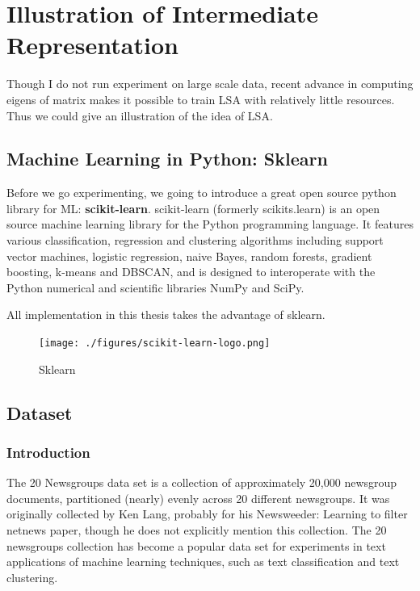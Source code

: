 \documentclass[a4paper]{book}
\begin{document}
  \section{Illustration of Intermediate Representation}
  Though I do not run experiment on large scale data, recent
  advance\cite{Halko:2011:FSR:2078879.2078881} in computing eigens of
  matrix makes it possible to train LSA with relatively little
  resources. Thus we could give an illustration of the idea of LSA.

  \subsection{Machine Learning in Python: Sklearn}

  Before we go experimenting, we going to introduce a great open source
  python library for ML: \textbf{scikit-learn}\cite{scikit-learn}.
  scikit-learn (formerly scikits.learn) is an open source machine
  learning library for the Python programming language. It features
  various classification, regression and clustering algorithms including
  support vector machines, logistic regression, naive Bayes, random
  forests, gradient boosting, k-means and DBSCAN, and is designed to
  interoperate with the Python numerical and scientific libraries NumPy
  and SciPy\cite{wiki_scikit_learn}.

  All implementation in this thesis takes the advantage of sklearn.

  \begin{figure}[h]
    \begin{center}
      \texttt{[image: ./figures/scikit-learn-logo.png]}
      \caption{Sklearn\label{fig:sklearn_logo}}
    \end{center}
  \end{figure}

  \subsection{Dataset}

    \subsubsection{Introduction}
    The 20 Newsgroups data set is a collection of approximately 20,000
    newsgroup documents, partitioned (nearly) evenly across 20 different
    newsgroups. It was originally collected by Ken Lang, probably for
    his Newsweeder: Learning to filter netnews paper, though he does not
    explicitly mention this collection. The 20 newsgroups collection has
    become a popular data set for experiments in text applications of
    machine learning techniques, such as text classification and text
    clustering\cite{20newsgroups}.
\end{document}
